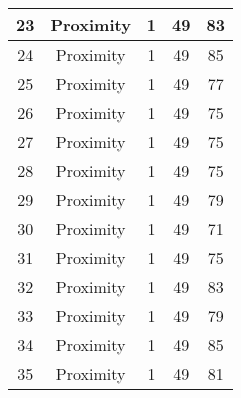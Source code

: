 \documentclass[results.tex]{subfiles}
\begin{document}
\begin{center}
\begin{tabular}{| c || c | c | c | c |}
            \hline
            23                      & Proximity                    & 1                      & 49                      & 83                   \\
            \hline
            24                      & Proximity                    & 1                      & 49                      & 85                   \\
            \hline
            25                      & Proximity                    & 1                      & 49                      & 77                   \\
            \hline
            26                      & Proximity                    & 1                      & 49                      & 75                   \\
            \hline
            27                      & Proximity                    & 1                      & 49                      & 75                   \\
            \hline
            28                      & Proximity                    & 1                      & 49                      & 75                   \\
            \hline
            29                      & Proximity                    & 1                      & 49                      & 79                   \\
            \hline
            30                      & Proximity                    & 1                      & 49                      & 71                   \\
            \hline
            31                      & Proximity                    & 1                      & 49                      & 75                   \\
            \hline
            32                      & Proximity                    & 1                      & 49                      & 83                   \\
            \hline
            33                      & Proximity                    & 1                      & 49                      & 79                   \\
            \hline
            34                      & Proximity                    & 1                      & 49                      & 85                   \\
            \hline
            35                      & Proximity                    & 1                      & 49                      & 81                   \\

\end{tabular}
\end{center}
\end{document}
